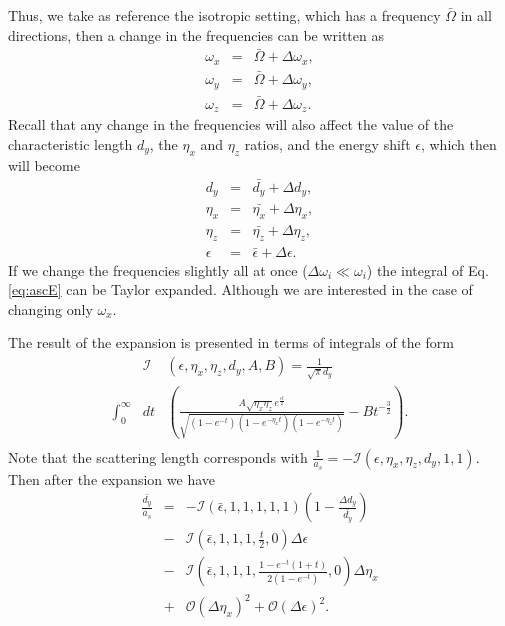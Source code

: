 \documentclass[aps,pre,twocolumn,superscriptaddress,showpacs]{revtex4-1}
\begin{document}
Thus, we take as reference the isotropic setting, which has a frequency $\bar{\Omega}$ in all directions, then a change in the frequencies can be written as
\begin{eqnarray}
\omega_x &=& \bar{\Omega} + \Delta \omega_x, \\
\omega_y &=& \bar{\Omega} + \Delta \omega_y, \\
\omega_z &=& \bar{\Omega} + \Delta \omega_z.
\label{eq:perturbation variables}
\end{eqnarray}
Recall that any change in the frequencies will also affect the value of the characteristic length $d_y$, the $\eta_x$ and $\eta_z$ ratios, and the energy shift $\epsilon$, which then will become
\begin{eqnarray}
d_y &=& \bar{d_y} + \Delta d_y, \\
\eta_x &=& \bar{\eta_x} + \Delta \eta_x, \\
\eta_z &=& \bar{\eta_z} + \Delta \eta_z, \\
\epsilon &=& \bar{\epsilon} + \Delta \epsilon. 
\label{eq:perturbation variables 2 }
\end{eqnarray}
If we change the frequencies slightly all at once ($\Delta \omega_i \ll \omega_i $) the integral of Eq. \eqref{eq:ascE} can be Taylor expanded. Although we are interested in the case of changing only $\omega_x$. 

The result of the expansion is presented in terms of integrals of the form 
\begin{eqnarray}
&\mathcal{I}&(\epsilon, \eta_x, \eta_z, d_y, A, B) = \frac{1}{\sqrt{\pi}d_y} \nonumber \\
\int^\infty_0 &dt& \left( \frac{A\sqrt{\eta_x \eta_z} e^{\frac{\epsilon t}{2}}}{\sqrt{(1 - e^{-t}) (1 - e^{-\eta_x t}) (1 - e^{-\eta_z t})} } - Bt^{-\frac{3}{2}}\right). \nonumber \\
\label{eq:Integral perturbation}
\end{eqnarray}
Note that the scattering length corresponds with $\frac{1}{a_s} = - \mathcal{I}(\epsilon, \eta_x, \eta_z, d_y, 1, 1)$. Then after the expansion we have
\begin{eqnarray}
\frac{\bar{d_y}}{a_s} &=& - \mathcal{I}(\bar{\epsilon}, 1, 1, 1, 1, 1) \left( 1-\frac{\Delta d_y}{\bar{d_y}}\right) \nonumber \\
&-& \mathcal{I}\left(\bar{\epsilon}, 1, 1, 1, \frac{t}{2}, 0 \right) \Delta \epsilon \nonumber \\
&-&  \mathcal{I}\left(\bar{\epsilon}, 1, 1, 1, \frac{1 - e^{-t}(1+t)}{2(1-e^{-t})}, 0 \right) \Delta \eta_x \nonumber \\
&+& \mathcal{O}(\Delta \eta_x)^2 + \mathcal{O} (\Delta \epsilon)^2.
\label{eq:result perturbation}
\end{eqnarray}
\end{document}
